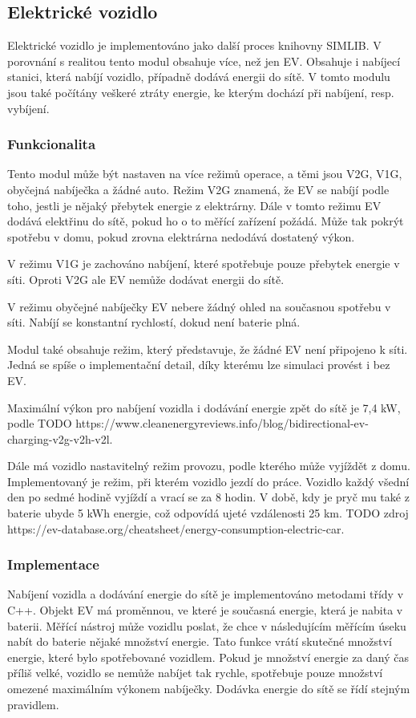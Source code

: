 \documentclass[12pt,a4paper]{article}
\begin{document}
\subsection{Elektrické vozidlo}
Elektrické vozidlo je implementováno jako další proces knihovny SIMLIB.
V porovnání s realitou tento modul obsahuje více, než jen EV.
Obsahuje i nabíjecí stanici, která nabíjí vozidlo, případně dodává energii do sítě.
V tomto modulu jsou také počítány veškeré ztráty energie, ke kterým dochází při nabíjení, resp. vybíjení.

\subsubsection{Funkcionalita}
Tento modul může být nastaven na více režimů operace, a těmi jsou V2G, V1G, obyčejná nabíječka a žádné auto.
Režim V2G znamená, že EV se nabíjí podle toho, jestli je nějaký přebytek energie z elektrárny.
Dále v tomto režimu EV dodává elektřinu do sítě, pokud ho o to měřící zařízení požádá.
Může tak pokrýt spotřebu v domu, pokud zrovna elektrárna nedodává dostatený výkon.

V režimu V1G je zachováno nabíjení, které spotřebuje pouze přebytek energie v síti.
Oproti V2G ale EV nemůže dodávat energii do sítě.

V režimu obyčejné nabíječky EV nebere žádný ohled na současnou spotřebu v síti.
Nabíjí se konstantní rychlostí, dokud není baterie plná.

Modul také obsahuje režim, který představuje, že žádné EV není připojeno k síti.
Jedná se spíše o implementační detail, díky kterému lze simulaci provést i bez EV.

Maximální výkon pro nabíjení vozidla i dodávání energie zpět do sítě je 7,4 kW, podle TODO https://www.cleanenergyreviews.info/blog/bidirectional-ev-charging-v2g-v2h-v2l.

Dále má vozidlo nastavitelný režim provozu, podle kterého může vyjíždět z domu.
Implementovaný je režim, při kterém vozidlo jezdí do práce.
Vozidlo každý všední den po sedmé hodině vyjíždí a vrací se za 8 hodin.
V době, kdy je pryč mu také z baterie ubyde 5 kWh energie,
což odpovídá ujeté vzdálenosti 25 km. TODO zdroj https://ev-database.org/cheatsheet/energy-consumption-electric-car.

\subsubsection{Implementace}
Nabíjení vozidla a dodávání energie do sítě je implementováno metodami třídy v C++.
Objekt EV má proměnnou, ve které je současná energie, která je nabita v baterii.
Měřící nástroj může vozidlu poslat, že chce v následujícím měřícím úseku nabít do baterie nějaké množství energie.
Tato funkce vrátí skutečné množství energie, které bylo spotřebované vozidlem.
Pokud je množství energie za daný čas příliš velké,
vozidlo se nemůže nabíjet tak rychle, spotřebuje pouze množství omezené maximálním výkonem nabíječky.
Dodávka energie do sítě se řídí stejným pravidlem.
\end{document}
